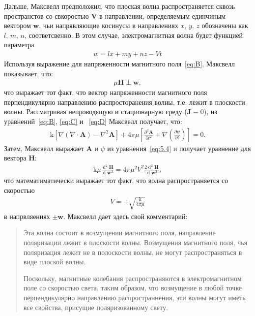 \documentclass[12pt, oneside, a4paper]{article}
\begin{document}
Дальше, Максвелл предположил, что плоская волна распространяется сквозь пространстов со свкоростью $\mathbf{V}$ в направлении, определяемым единчиным вектором $\mathbf{w}$, чьи напрявляющие косинусы в направлениях $x,\,y,\,z$ обозначены как $l,\,m,\,n$, соответсвенно. В этом случае, электромагнитная волна будет функцией параметра
\begin{align*}
w=lx+my+nz-Vt
\end{align*}
Используя выражение для напряженности магнитного поля~\eqref{eq:B}, Максвелл показывает, что:
\begin{align*}
\mu\mathbf{H}\perp\mathbf{w},
\end{align*}
что выражает тот факт, что вектор напряженности магнитного поля перпендикулярно направлению распросторанения волны, т.е. лежит в плоскости волны. Рассматривая непроводящую и стационарную среду ($\mathbf{J}\equiv0$), из уравнений~\eqref{eq:B}, \eqref{eq:C} и ~\eqref{eq:D} Максвелл получает, что:
\begin{align}
\mathrm{k}\left[\nabla\left(\nabla\cdot\mathbf{A}\right)-\nabla^2\mathbf{A}\right]+4\pi\mu\left[\frac{\partial^2\mathbf{A}}{\partial{}t^2}+\nabla\left(\frac{\partial\psi}{\partial{}t}\right)\right]=0.\label{eq:5.4}
\end{align}
Затем, Максвелл выражает $\mathbf{A}$ и $\psi$ из уравнения~\eqref{eq:5.4} и получает уравнение для вектора $\mathbf{H}$:
\begin{align*}
\mathrm{k}\mu\frac{\operatorname{d}^2\mathbf{H}}{\operatorname{d}\mathbf{w}^2}=4\pi\mu^2V^2\frac{2\operatorname{d}^2\mathbf{H}}{\operatorname{d}\mathbf{w}^2},
\end{align*}
что математиматически выражает тот факт, что волна распространяется со скоростью\begin{align}
V=\pm\sqrt{\frac{\mathrm{k}}{4\pi\mu}}\label{eq:5.7}
\end{align} 
в напрвляениях $\pm\mathbf{w}$.
Максвелл дает здесь свой комментарий:
\begin{quotation}
\small
Эта волна состоит в возмущении магнитного поля, направление поляризации лежит в плоскости волны. Возмущения магнитного поля, чья поляризация лежит не в полоскости волны, не могут распространяться в виде плоской волны.

Поскольку, магнитные колебания распространяются в электромагнитном поле со скоростью света, таким образом, что возмущение в любой точке перпендикулярно направлению распространнения, эти волны могут иметь все свойства, присущие поляризованному свету.
\end{quotation}
\end{document}

